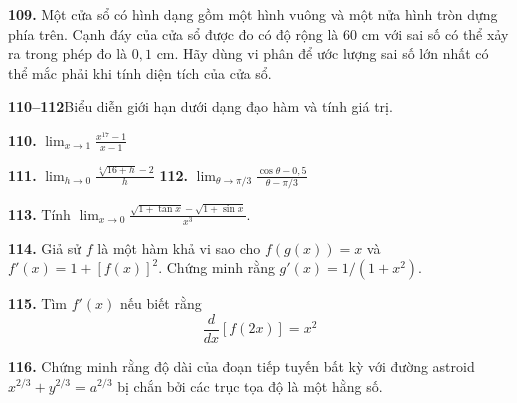 \noindent
\begin{minipage}[t]{0.475\textwidth}
    \textbf{109.} Một cửa sổ có hình dạng gồm một hình vuông và một nửa hình tròn dựng phía trên. Cạnh đáy của cửa sổ được đo có độ rộng là $60\text{ cm}$ với sai số có thể xảy ra trong phép đo là $0{,}1\text{ cm}$. Hãy dùng vi phân để ước lượng sai số lớn nhất có thể mắc phải khi tính diện tích của cửa sổ.

    \vspace{5.5mm}
    {\color{stewartcyan}\textbf{110--112}}\quad Biểu diễn giới hạn dưới dạng đạo hàm và tính giá trị.

    \vspace{4mm}
    \textbf{110.} $\displaystyle \lim_{x \to 1} \frac{x^{17} - 1}{x - 1}$

    \vspace{6mm}
    \textbf{111.} $\displaystyle \lim_{h \to 0} \frac{\sqrt[4]{16 + h} - 2}{h}$%
    \hfill
    \textbf{112.} $\displaystyle \lim_{\theta \to \pi/3} \frac{\cos\theta - 0{,}5}{\theta - \pi/3}$
\end{minipage}%
\hfill
\begin{minipage}[t]{0.475\textwidth}
    \textbf{113.} Tính $\displaystyle \lim_{x \to 0} \frac{\sqrt{1 + \tan x} - \sqrt{1 + \sin x}}{x^3}$.

    \vspace{5mm}
    \textbf{114.} Giả sử $f$ là một hàm khả vi sao cho $f(g(x)) = x$ và $f'(x) = 1 + [f(x)]^2$. Chứng minh rằng $g'(x) = 1/(1 + x^2)$.

    \vspace{4.5mm}
    \textbf{115.} Tìm $f'(x)$ nếu biết rằng
    \[
    \frac{d}{dx}[f(2x)] = x^2
    \]

    \vspace{3mm}
    \textbf{116.} Chứng minh rằng độ dài của đoạn tiếp tuyến bất kỳ với đường astroid $x^{2/3} + y^{2/3} = a^{2/3}$ bị chắn bởi các trục tọa độ là một hằng số.
\end{minipage}

\vspace{7mm}
\noindent{\color{stewartcyan}\rule{\textwidth}{1.5pt}}
